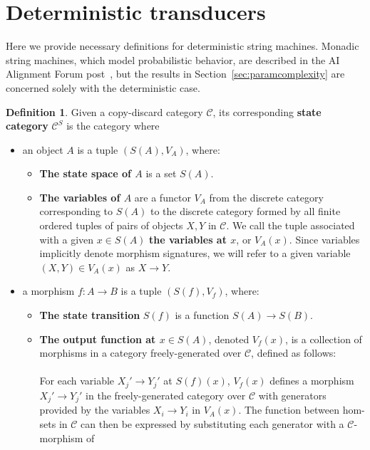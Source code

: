 \documentclass{article}
\theoremstyle{definition}
\newtheorem{definition}{Definition}[section]
\theoremstyle{remark}
\begin{document}
\section{Deterministic transducers}
Here we provide necessary definitions for deterministic
string machines. Monadic string machines, which model
probabilistic behavior, are described in the AI Alignment Forum
post~\cite{kosoy2023compositional}, but the results in
Section~\ref{sec:paramcomplexity} are concerned solely with
the deterministic case.
\begin{definition}
\label{def:statecategory} Given a copy-discard category
$\mathcal{C}$, its corresponding
\textbf{state category} $\mathcal{C}^S$ is the category where
\begin{itemize}
    \item an object $A$ is a tuple $(S(A), V_A)$, where:
    \begin{itemize}
    \item \textbf{The state space of $A$} is a set $S(A)$.
    \item \textbf{The variables of $A$} are a functor $V_A$ from the
    discrete category corresponding to $S(A)$ to the discrete category
    formed by all finite ordered tuples of pairs of objects
    $X,Y$ in $\mathcal{C}$. We call the tuple associated with a given
    $x \in
    S(A)$ \textbf{the variables at $x$}, or $V_A(x)$. Since variables
    implicitly denote morphism signatures, we will refer to a given
    variable $(X,Y) \in V_A(x)$ as $X\to Y$. 
\end{itemize}
    \item a morphism $f:A \to B$ is a tuple
    $(S(f),V_f)$, where:
    \begin{itemize}
        \item \textbf{The state transition} $S(f)$ is a function
        $S(A) \to S(B)$.
        \item \textbf{The output function at $x \in S(A)$},
        denoted $V_f(x)$, is a collection of morphisms in a
        category freely-generated over
        $\mathcal{C}$, defined as follows:
        \\ \\
        For each variable $X_j'\to Y_j'$ at
        $S(f)(x)$,
        $V_f(x)$ defines a morphism $X_j'\to Y_j'$
        in the freely-generated
        category over $\mathcal{C}$ with generators
        provided by the variables
        $X_i\to Y_i$ in $V_A(x)$. The function
        between hom-sets in $\mathcal{C}$ can then be expressed by
        substituting each generator with a $\mathcal{C}$-morphism of

\end{itemize}
\end{itemize}
\end{definition}
\end{document}
